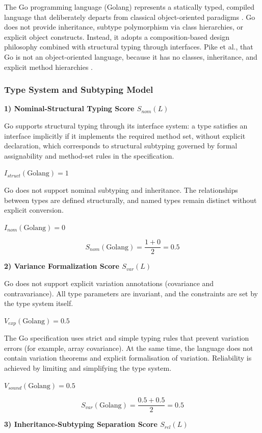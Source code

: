 The Go programming language (Golang) represents a statically typed, compiled language that deliberately departs from classical object-oriented paradigms \cite{go_spec}. Go does not provide inheritance, subtype polymorphism via class hierarchies, or explicit object constructs. Instead, it adopts a composition-based design philosophy combined with structural typing through interfaces. Pike et al., that Go is not an object-oriented language, because it has no classes, inheritance, and explicit method hierarchies \cite{pike2012go}.

\subsubsection{Type System and Subtyping Model}

\textbf{1) Nominal-Structural Typing Score $S_{nom}(L)$}

Go supports structural typing through its interface system: a type satisfies an interface implicitly if it implements the required method set, without explicit declaration, which corresponds to structural subtyping governed by formal assignability and method-set rules in the specification. 

$I_{struct}(\text{Golang})=1$

Go does not support nominal subtyping and inheritance. The relationships between types are defined structurally, and named types remain distinct without explicit conversion.

$I_{nom}(\text{Golang})=0$

\[
    S_{nom}(\text{Golang})=\frac{1+0}{2}=0.5
\]

\textbf{2) Variance Formalization Score $S_{var}(L)$}

Go does not support explicit variation annotations (covariance and contravariance). All type parameters are invariant, and the constraints are set by the type system itself.

$V_{exp}(\text{Golang})=0.5$

The Go specification uses strict and simple typing rules that prevent variation errors (for example, array covariance). At the same time, the language does not contain variation theorems and explicit formalisation of variation.  Reliability is achieved by limiting and simplifying the type system.

$V_{sound}(\text{Golang})=0.5$

\[
    S_{var}(\text{Golang})=\frac{0.5+0.5}{2}=0.5
\]

\textbf{3) Inheritance-Subtyping Separation Score $S_{rel}(L)$}


